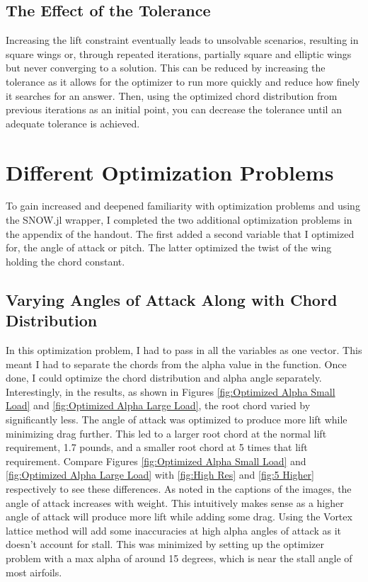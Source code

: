 \documentclass{article}
\begin{document}
\subsection{The Effect of the Tolerance}

Increasing the lift constraint eventually leads to unsolvable scenarios, resulting in square wings or, through repeated iterations, partially square and elliptic wings but never converging to a solution. This can be reduced by increasing the tolerance as it allows for the optimizer to run more quickly and reduce how finely it searches for an answer. Then, using the optimized chord distribution from previous iterations as an initial point, you can decrease the tolerance until an adequate tolerance is achieved.

\section{Different Optimization Problems}

To gain increased and deepened familiarity with optimization problems and using the SNOW.jl wrapper, I completed the two additional optimization problems in the appendix of the handout. The first added a second variable that I optimized for, the angle of attack or pitch. The latter optimized the twist of the wing holding the chord constant.

\subsection{Varying Angles of Attack Along with Chord Distribution}
In this optimization problem, I had to pass in all the variables as one vector. This meant I had to separate the chords from the alpha value in the function. Once done, I could optimize the chord distribution and alpha angle separately. Interestingly, in the results, as shown in Figures \ref{fig:Optimized Alpha Small Load} and \ref{fig:Optimized Alpha Large Load}, the root chord varied by significantly less. The angle of attack was optimized to produce more lift while minimizing drag further. This led to a larger root chord at the normal lift requirement, 1.7 pounds, and a smaller root chord at 5 times that lift requirement. Compare Figures \ref{fig:Optimized Alpha Small Load} and \ref{fig:Optimized Alpha Large Load} with \ref{fig:High Res} and \ref{fig:5 Higher} respectively to see these differences. As noted in the captions of the images, the angle of attack increases with weight. This intuitively makes sense as a higher angle of attack will produce more lift while adding some drag. Using the Vortex lattice method will add some inaccuracies at high alpha angles of attack as it doesn't account for stall. This was minimized by setting up the optimizer problem with a max alpha of around 15 degrees, which is near the stall angle of most airfoils.
\end{document}
